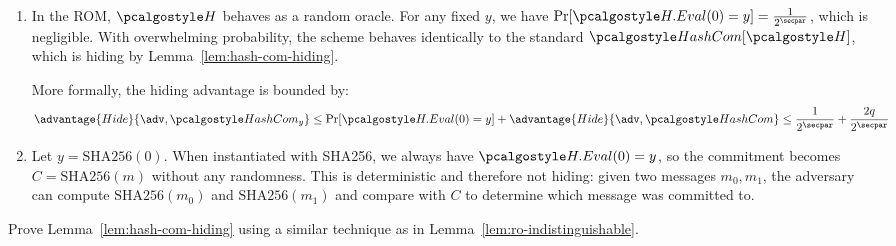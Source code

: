 \ifsolutions
\begin{mysolution}
  \begin{enumerate}
    \item In the ROM, $\algo{H}$ behaves as a random oracle. For any fixed $y$, we have $\Pr[\algo{H.Eval}(0) = y] = \frac{1}{2^\secpar}$, which is negligible. With overwhelming probability, the scheme behaves identically to the standard $\algo{HashCom}[\algo{H}]$, which is hiding by Lemma~\ref{lem:hash-com-hiding}.
    
    More formally, the hiding advantage is bounded by:
    \[
    \advantage{Hide}{\adv, \algo{HashCom}_y} \leq \Pr[\algo{H.Eval}(0) = y] + \advantage{Hide}{\adv, \algo{HashCom}} \leq \frac{1}{2^\secpar} + \frac{2q}{2^\secpar}
    \]
    
    \item Let $y = \text{SHA256}(0)$. When instantiated with SHA256, we always have $\algo{H.Eval}(0) = y$, so the commitment becomes $C = \text{SHA256}(m)$ without any randomness. This is deterministic and therefore not hiding: given two messages $m_0, m_1$, the adversary can compute $\text{SHA256}(m_0)$ and $\text{SHA256}(m_1)$ and compare with $C$ to determine which message was committed to.
  \end{enumerate}
\end{mysolution}
\fi

\begin{exercise}\label{ex:hash-com-hiding}
  Prove Lemma~\ref{lem:hash-com-hiding} using a similar technique as in Lemma~\ref{lem:ro-indistinguishable}.
\end{exercise}

